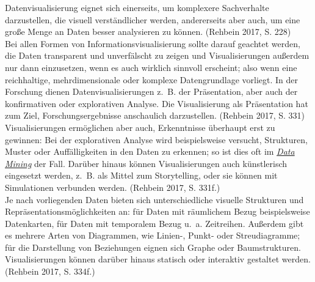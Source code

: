 \documentclass{article}
\begin{document}
    Datenvisualisierung eignet sich einerseits, um komplexere Sachverhalte darzustellen, die visuell verständlicher werden, andererseits aber auch, um eine große Menge an Daten besser analysieren zu können. (Rehbein 2017, S. 228)\\
            
        Bei allen Formen von Informationsvisualisierung sollte darauf geachtet werden, die Daten transparent und unverfälscht zu zeigen und Visualisierungen außerdem nur dann einzusetzen, wenn es auch wirklich sinnvoll erscheint; also wenn eine reichhaltige, mehrdimensionale oder komplexe Datengrundlage vorliegt. In der Forschung dienen Datenvisualisierungen z. B. der Präsentation, aber auch der konfirmativen oder explorativen Analyse. Die Visualisierung als Präsentation hat zum Ziel, Forschungsergebnisse anschaulich darzustellen. (Rehbein 2017, S. 331) Visualisierungen ermöglichen aber auch, Erkenntnisse überhaupt erst zu gewinnen: Bei der explorativen Analyse wird beispielsweise versucht, Strukturen, Muster oder Auffälligkeiten in den Daten zu erkennen; so ist dies oft im \emph{\href{http://gams.uni-graz.at/o:konde.48}{Data Mining}} der Fall. Darüber hinaus können Visualisierungen auch künstlerisch eingesetzt werden, z. B. als Mittel zum Storytelling, oder sie können mit Simulationen verbunden werden. (Rehbein 2017, S. 331f.)\\
            
        Je nach vorliegenden Daten bieten sich unterschiedliche visuelle Strukturen und Repräsentationsmöglichkeiten an: für Daten mit räumlichem Bezug beispielsweise Datenkarten, für Daten mit temporalem Bezug u. a. Zeitreihen. Außerdem gibt es mehrere Arten von Diagrammen, wie Linien-, Punkt- oder Streudiagramme; für die Darstellung von Beziehungen eignen sich Graphe oder Baumstrukturen. Visualisierungen können darüber hinaus statisch oder interaktiv gestaltet werden. (Rehbein 2017, S. 334f.)\\
            
\end{document}
